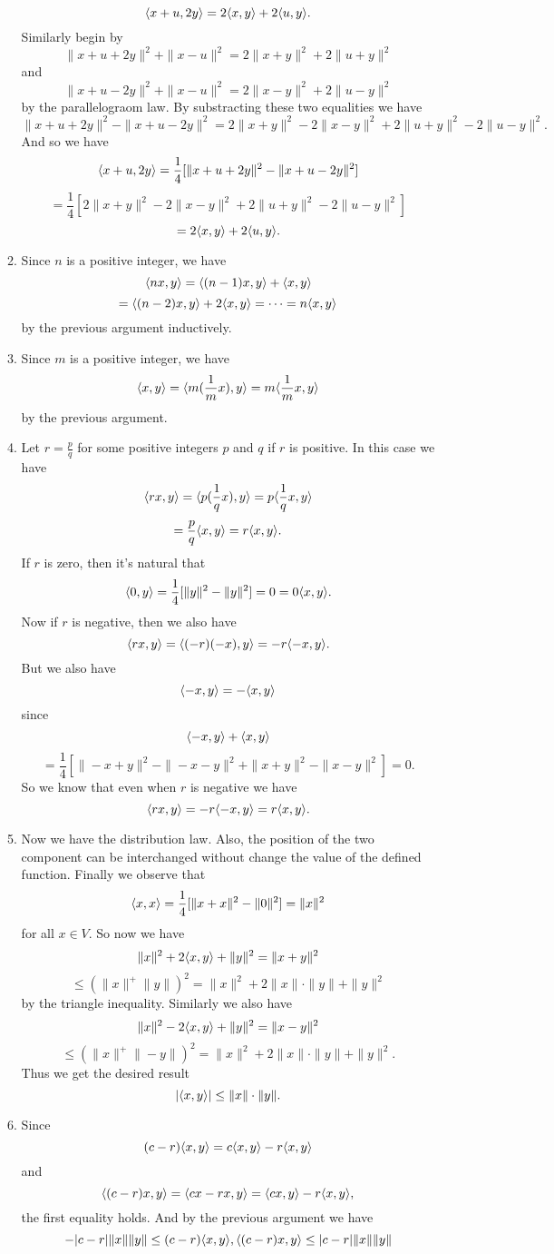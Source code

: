 \begin{enumerate}
\begin{enumerate}
\[\langle x+u,2y\rangle =2\langle x,y\rangle +2\langle u,y\rangle .\]
Similarly begin by 
\[\|x+u+2y\|^2+\|x-u\|^2=2\|x+y\|^2+2\|u+y\|^2\]
and 
\[\|x+u-2y\|^2+\|x-u\|^2=2\|x-y\|^2+2\|u-y\|^2\]
by the parallelograom law. By substracting these two equalities we have 
\[\|x+u+2y\|^2-\|x+u-2y\|^2=2\|x+y\|^2-2\|x-y\|^2+2\|u+y\|^2-2\|u-y\|^2.\]
And so we have 
\[\langle x+u,2y\rangle =\frac{1}{4}[\|x+u+2y\|^2-\|x+u-2y\|^2]\]
\[=\frac{1}{4}[2\|x+y\|^2-2\|x-y\|^2+2\|u+y\|^2-2\|u-y\|^2]\]
\[=2\langle x,y\rangle +2\langle u,y\rangle .\]
\item Since $n$ is a positive integer, we have 
\[\langle nx,y\rangle =\langle (n-1)x,y\rangle +\langle x,y\rangle \]
\[=\langle (n-2)x,y\rangle +2\langle x,y\rangle =\cdots =n\langle x,y\rangle \]
by the previous argument inductively.
\item Since $m$ is a positive integer, we have 
\[\langle x,y\rangle =\langle m(\frac{1}{m}x),y\rangle =m\langle \frac{1}{m}x,y\rangle \]
by the previous argument.
\item Let $r=\frac{p}{q}$ for some positive integers $p$ and $q$ if $r$ is positive. In this case we have 
\[\langle rx,y\rangle =\langle p(\frac{1}{q}x),y\rangle =p\langle \frac{1}{q}x,y\rangle \]
\[=\frac{p}{q}\langle x,y\rangle =r\langle x,y\rangle .\]
If $r$ is zero, then it's natural that 
\[\langle 0,y\rangle =\frac{1}{4}[\|y\|^2-\|y\|^2]=0=0\langle x,y\rangle .\]
Now if $r$ is negative, then we also have 
\[\langle rx,y\rangle =\langle (-r)(-x),y\rangle =-r\langle -x,y\rangle .\]
But we also have 
\[\langle -x,y\rangle =-\langle x,y\rangle \]
since 
\[\langle -x,y\rangle +\langle x,y\rangle \]
\[=\frac{1}{4}[\|-x+y\|^2-\|-x-y\|^2+\|x+y\|^2-\|x-y\|^2]=0.\]
So we know that even when $r$ is negative we have 
\[\langle rx,y\rangle =-r\langle -x,y\rangle =r\langle x,y\rangle .\]
\item Now we have the distribution law. Also, the position of the two component can be interchanged without change the value of the defined function. Finally we observe that 
\[\langle x,x\rangle =\frac{1}{4}[\|x+x\|^2-\|0\|^2]=\|x\|^2\]
for all $x\in V$. So now we have 
\[\|x\|^2+2\langle x,y\rangle +\|y\|^2=\|x+y\|^2\]
\[\leq (\|x\|^+\|y\|)^2=\|x\|^2+2\|x\|\cdot \|y\|+\|y\|^2\]
by the triangle inequality. Similarly we also have 
\[\|x\|^2-2\langle x,y\rangle +\|y\|^2=\|x-y\|^2\]
\[\leq (\|x\|^+\|-y\|)^2=\|x\|^2+2\|x\|\cdot \|y\|+\|y\|^2.\]
Thus we get the desired result 
\[|\langle x,y\rangle |\leq \|x\|\cdot \|y\|.\]
\item Since 
\[(c-r)\langle x,y\rangle =c\langle x,y\rangle -r\langle x,y\rangle\]
and 
\[\langle (c-r)x,y\rangle =\langle cx-rx,y\rangle =\langle cx,y\rangle -r\langle x,y\rangle ,\]
the first equality holds. And by the previous argument we have 
\[-|c-r|\|x\|\|y\|\leq (c-r)\langle x,y\rangle ,\langle (c-r)x,y\rangle \leq |c-r|\|x\|\|y\|\]

\end{enumerate}
\end{enumerate}
